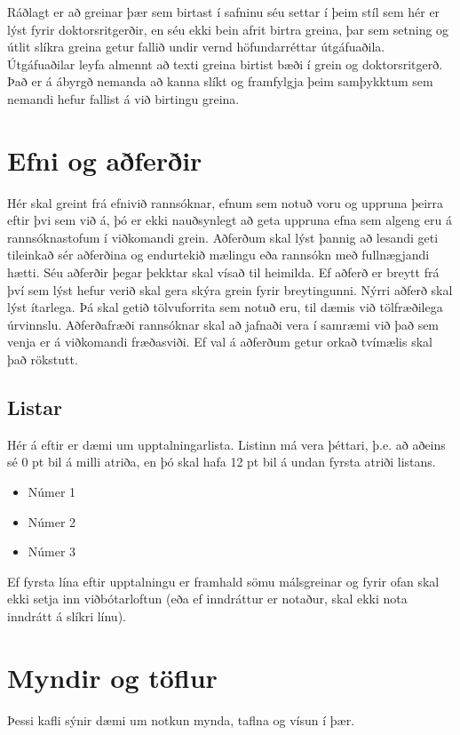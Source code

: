 \documentclass[a4paper, 12pt, twoside]{scrreprt}
\begin{document}
Ráðlagt er að greinar þær sem birtast í safninu séu settar í þeim stíl sem hér er lýst fyrir doktorsritgerðir, en séu ekki bein afrit birtra greina, þar sem setning og útlit slíkra greina getur fallið undir vernd höfundarréttar útgáfuaðila. Útgáfuaðilar leyfa almennt að texti greina birtist bæði í grein og doktorsritgerð. Það er á ábyrgð nemanda að kanna slíkt og framfylgja þeim samþykktum sem nemandi hefur fallist á við birtingu greina.
 
\chapter{Efni og aðferðir}
Hér skal greint frá efnivið rannsóknar, efnum sem notuð voru og uppruna þeirra eftir þvi sem við á, þó er ekki nauðsynlegt að geta uppruna efna sem algeng eru á rannsóknastofum í viðkomandi grein. Aðferðum skal lýst þannig að lesandi geti tileinkað sér aðferðina og endurtekið mælingu eða rannsókn með fullnægjandi hætti. Séu aðferðir þegar þekktar skal vísað til heimilda. Ef aðferð er breytt frá því sem lýst hefur verið skal gera skýra grein fyrir breytingunni. Nýrri aðferð skal lýst ítarlega. Þá skal getið tölvuforrita sem notuð eru, til dæmis við tölfræðilega úrvinnslu. Aðferðafræði rannsóknar skal að jafnaði vera í samræmi við það sem venja er á viðkomandi fræðasviði. Ef val á aðferðum getur orkað tvímælis skal það rökstutt.

\section{Listar}
Hér á eftir er dæmi um upptalningarlista. Listinn má vera þéttari, þ.e. að aðeins sé 0 pt bil á milli atriða, en þó skal hafa 12 pt bil á undan fyrsta atriði listans.
\begin{itemize}
 \item Númer 1
 \item Númer 2
 \item Númer 3
\end{itemize}
Ef fyrsta lína eftir upptalningu er framhald sömu málsgreinar og fyrir ofan skal ekki setja inn viðbótarloftun (eða ef inndráttur er notaður, skal ekki nota inndrátt á slíkri línu). 

\chapter{Myndir og töflur}
Þessi kafli sýnir dæmi um notkun mynda, taflna og vísun í þær.
\end{document}
